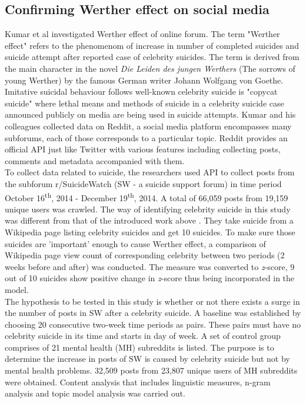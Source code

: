 \subsection{Confirming Werther effect on social media}
Kumar et al \cite{Kumar2015a} investigated Werther effect of online forum. The term "Werther effect" refers to the phenomenom of increase in number of completed suicides and suicide attempt after reported case of celebrity suicides. The term is derived from the main character in the novel \textit{Die Leiden des jungen Werthers} (The sorrows of young Werther) by the famous German writer Johann Wolfgang von Goethe. Imitative suicidal behaviour follows well-known celebrity suicide is "copycat suicide" where lethal means and methods of suicide in a celebrity suicide case announced publicly on media are being used in suicide attempts. Kumar and his colleagues collected data on Reddit, a social media platform encompasses many subforums, each of those corresponds to a particular topic. Reddit provides an official API just like Twitter with various features including collecting posts, comments and metadata accompanied with them.\\
To collect data related to suicide, the researchers used API to collect posts from the subforum r/SuicideWatch (SW - a suicide support forum) in time period October 16\textsuperscript{th}, 2014 - December 19\textsuperscript{th}, 2014. A total of 66,059 posts from 19,159 unique users was crawled. The way of identifying celebrity suicide in this study was different from that of the introduced work above \cite{Won2013}. They take suicide from a Wikipedia page listing celebrity suicides and get 10 suicides. To make sure those suicides are 'important' enough to cause Werther effect, a comparison of Wikipedia page view count of corresponding celebrity between two periods (2 weeks before and after) was conducted. The measure was converted to \textit{z}-score, 9 out of 10 suicides show positive change in \textit{z}-score thus being incorporated in the model. \\
The hypothesis to be tested in this study is whether or not there exists a surge in the number of posts in SW after a celebrity suicide. A baseline was established by choosing 20 consecutive two-week time periods as pairs. These pairs must have no celebrity suicide in its time and starts in day of week. A set of control group comprises of 21 mental health (MH) subreddits is listed. The purpose is to determine the increase in posts of SW is caused by celebrity suicide but not by mental health problems. 32,509 posts from 23,807 unique users of MH subreddits were obtained. Content analysis that includes linguistic measures, n-gram analysis and topic model analysis was carried out.\\
